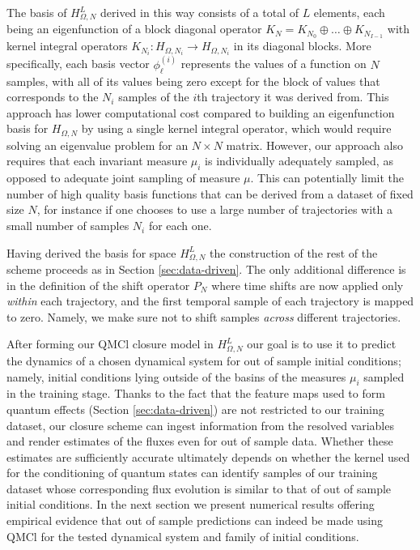 \documentclass[letterpaper,10pt,3p,preprint]{elsarticle}
\begin{document}
The basis of $H_{\Omega,N}^L$ derived in this way consists of a
total of $L$ elements, each being an eigenfunction of a block diagonal
operator $K_N=K_{N_0}\oplus\ldots\oplus K_{N_{I-1}}$
with kernel integral operators
$K_{N_i}\colon H_{\Omega,N_i}\to H_{\Omega,N_i}$
in its diagonal blocks.
More specifically, each basis vector $\phi_\ell^{(i)}$
represents the values of a function on $N$ samples,
with all of its values being zero except for the block of values
that corresponds to the $N_i$ samples of the $i$th trajectory it
was derived from.
This approach has lower computational cost compared to building
an eigenfunction basis for $H_{\Omega,N}$
by using a single kernel integral operator,
which would require solving an eigenvalue problem for an
$N\times N$ matrix.
However, our approach also requires that each invariant measure
$\mu_i$ is individually adequately sampled,
as opposed to adequate joint sampling of measure $\mu$.
This can potentially limit the number of high quality basis functions
that can be derived from a dataset of fixed size $N$,
for instance if one chooses to use a large number of trajectories
with a small number of samples $N_i$ for each one.


Having derived the basis for space $H_{\Omega,N}^L$
the construction of the rest of the scheme proceeds as in
Section \ref{sec:data-driven}.
The only additional difference is in the definition of the
shift operator $P_N$
where time shifts are now applied only \emph{within} each
trajectory, and the first temporal sample of each trajectory
is mapped to zero.
Namely, we make sure not to shift samples
\emph{across} different trajectories.

After forming our QMCl closure model in $H_{\Omega,N}^L$
our goal is to use it to predict the dynamics of a chosen
dynamical system for out of sample initial conditions;
namely, initial conditions lying outside of the basins of the
measures $\mu_i$ sampled in the training stage.
Thanks to the fact that the feature maps used to form
quantum effects (Section \ref{sec:data-driven})
are not restricted to our training dataset,
our closure scheme can ingest information from the resolved variables
and render estimates of the fluxes even for out of sample data.
Whether these estimates are sufficiently accurate ultimately depends
on whether the kernel used for the conditioning of quantum states can
identify samples of our training dataset whose corresponding flux
evolution is similar to that of out of sample initial conditions.
In the next section we present numerical results offering empirical
evidence that out of sample predictions can indeed be made using
QMCl for the tested dynamical system and family of initial conditions.
\end{document}
